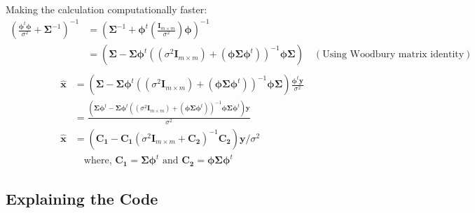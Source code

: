 \documentclass[fleqn, 11pt]{article}
\newcommand{\bs}[1]{\boldsymbol{#1}}
\begin{document}
Making the calculation computationally faster:
\begin{equation*}
    \begin{aligned}
        \left( \frac{\bs{\phi}^t \bs{\phi}}{\sigma^2} + \bs{\Sigma}^{-1} \right)^{-1} &= \left( \bs{\Sigma}^{-1} + \bs{\phi}^t \left(\frac{\bs{I}_{m \times m}}{\sigma^2}\right) \bs{\phi} \right)^{-1} \\
            &= \left( \bs{\Sigma} - \bs{\Sigma} \bs{\phi}^t \left( (\sigma^2 \bs{I}_{m \times m}) + (\bs{\phi} \bs{\Sigma} \bs{\phi}^t) \right)^{-1} \bs{\phi} \bs{\Sigma} \right) \quad (\text{Using Woodbury matrix identity}) \\
    \end{aligned}
\end{equation*}
\begin{equation*}
    \begin{aligned}
        \bs{\hat{x}} &= \left( \bs{\Sigma} - \bs{\Sigma} \bs{\phi}^t \left( (\sigma^2 \bs{I}_{m \times m}) + (\bs{\phi} \bs{\Sigma} \bs{\phi}^t) \right)^{-1} \bs{\phi} \bs{\Sigma} \right) \frac{\bs{\phi}^t \bs{y}}{\sigma^2} \\
            &= \frac{\left( \bs{\Sigma\phi}^t - \bs{\Sigma\phi}^t \left( (\sigma^2 \bs{I}_{m \times m}) + (\bs{\phi\Sigma\phi}^t) \right)^{-1} \bs{\phi\Sigma\phi}^t \right) \bs{y}}{\sigma^2} \\
        \bs{\hat{x}} &= \left(\bs{C_1} - \bs{C_1} \left( \sigma^2 \bs{I}_{m \times m} + \bs{C_2} \right)^{-1} \bs{C_2} \right) \bs{y} / \sigma^2 \\
            & \quad \text{where, $\bs{C_1} = \bs{\Sigma\phi}^t$ and $\bs{C_2} = \bs{\phi\Sigma\phi}^t$}
    \end{aligned}
\end{equation*}

\medskip

\subsection*{Explaining the Code}
\end{document}
